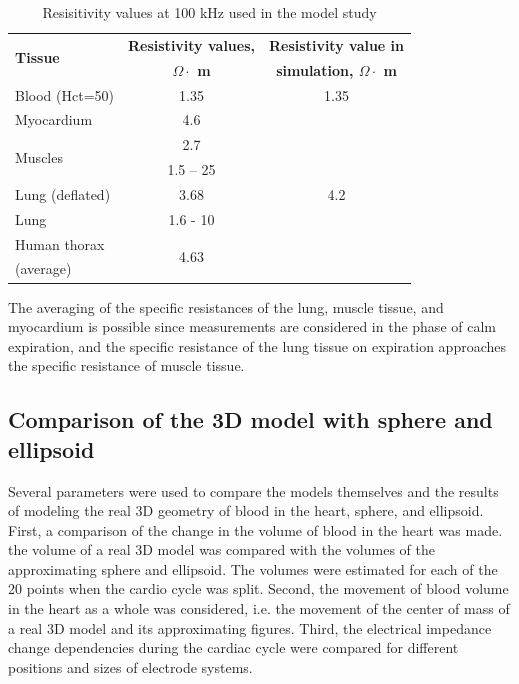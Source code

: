 \documentclass[conference]{IEEEtran}
\begin{document}
\begin{table}[htbp]
    \caption{Resisitivity values at  100 kHz used in the model study}
    \begin{center}
        \begin{tabular}{|l|c|c|}
            \hline
            \multirow{2}{*}{\textbf{Tissue}}              &     \textbf{Resistivity values,}      &    \textbf{Resistivity value in}  \\
            &   \textbf{$\Omega \cdot$ m}     &   \textbf{ simulation, $\Omega \cdot$ m} \\
            \hline
            Blood (Hct=50)           & 1.35\cite{Hill1975}           & 1.35      \\
            \hline
            Myocardium               & 4.6 \cite{Hasgall}       & \multirow{7}{*}{4.2}\\
            \cline{1-2}
            \multirow{2}{*}{Muscles} & 2.7 \cite{Hasgall}           &     \\
            \cline{2-2}
            & 1.5 – 25 \cite{Rush1963}           &   \\
            \cline{1-2}
            Lung (deflated)          & 3.68 \cite{Hasgall}     &         \\
            \cline{1-2}
            Lung                     & 1.6 - 10 \cite{Grimnes2008}       &    \\
            \cline{1-2}
            Human thorax & \multirow{2}{*}{4.63 \cite{Rush1963} }  &   \\
            (average)   & &   \\
            \hline
        \end{tabular}
        \label{tab:table}
    \end{center}
\end{table}

The averaging of the specific resistances of the lung, muscle tissue, and
myocardium is possible since measurements are considered in the phase of calm
expiration, and the specific resistance of the lung tissue on expiration
approaches the specific resistance of muscle tissue.

\subsection{Comparison of the 3D model with sphere and ellipsoid}

Several parameters were used to compare the models themselves and the results of
modeling the real 3D geometry of blood in the heart, sphere, and ellipsoid.
First, a comparison of the change in the volume of blood in the heart  was made.
the volume of a real 3D model was compared with the volumes of the approximating
sphere and ellipsoid. The volumes were estimated for each of the 20 points when
the cardio cycle was split. Second, the movement of blood volume in the heart as
a whole was considered, i.e. the movement of the center of mass of a real 3D
model and its approximating figures. Third, the electrical impedance change
dependencies during the cardiac cycle were compared for different positions and
sizes of electrode systems.
\end{document}
